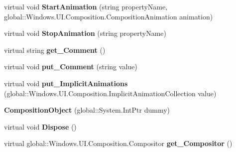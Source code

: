 \begin{DoxyCompactItemize}
virtual void {\bfseries Start\+Animation} (string property\+Name, global\+::\+Windows.\+U\+I.\+Composition.\+Composition\+Animation animation)
\item 
\mbox{\label{class_windows_1_1_u_i_1_1_composition_1_1_composition_object_a1cd6b40941abd315607a06f492a8bc8f}} 
virtual void {\bfseries Stop\+Animation} (string property\+Name)
\item 
\mbox{\label{class_windows_1_1_u_i_1_1_composition_1_1_composition_object_ae75723b4139b9231f070eeeff95eb764}} 
virtual string {\bfseries get\+\_\+\+Comment} ()
\item 
\mbox{\label{class_windows_1_1_u_i_1_1_composition_1_1_composition_object_a489899a008945284e6ce17e08c880cb7}} 
virtual void {\bfseries put\+\_\+\+Comment} (string value)
\item 
\mbox{\label{class_windows_1_1_u_i_1_1_composition_1_1_composition_object_ad8d4008a5c31ce42878ce448fe3e5598}} 
virtual void {\bfseries put\+\_\+\+Implicit\+Animations} (global\+::\+Windows.\+U\+I.\+Composition.\+Implicit\+Animation\+Collection value)
\item 
\mbox{\label{class_windows_1_1_u_i_1_1_composition_1_1_composition_object_a31b74b02386afece7eb73f6d8009fdea}} 
{\bfseries Composition\+Object} (global\+::\+System.\+Int\+Ptr dummy)
\item 
\mbox{\label{class_windows_1_1_u_i_1_1_composition_1_1_composition_object_a443e6ebcc8d54382c90b7a6309ef1b1f}} 
virtual void {\bfseries Dispose} ()
\item 
\mbox{\label{class_windows_1_1_u_i_1_1_composition_1_1_composition_object_a02238179cbd70c9e4a518009d12e39e7}} 
virtual global\+::\+Windows.\+U\+I.\+Composition.\+Compositor {\bfseries get\+\_\+\+Compositor} ()
\item 
\mbox{\label{class_windows_1_1_u_i_1_1_composition_1_1_composition_object_a365892d3180752a586915b7673ffda82}} 

\end{DoxyCompactItemize}
